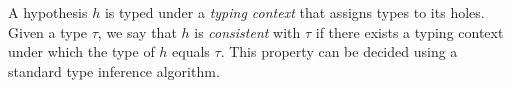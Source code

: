 A hypothesis $h$ is typed under a {\em typing context} that assigns
types to its holes. Given a type $\tau$, we say that $h$ is {\em
  consistent} with $\tau$ if there exists a typing context under which
the type of $h$ equals $\tau$. This property can be decided using a 
standard type inference algorithm.
